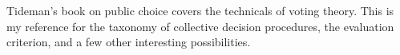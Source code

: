 Tideman's book on public choice covers the technicals of voting theory.  This is my reference for the taxonomy of collective decision procedures, the evaluation criterion, and a few other interesting possibilities.
